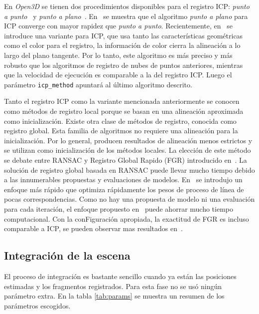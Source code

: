En \textit{Open3D} se tienen dos procedimientos disponibles para el registro ICP: \textit{punto a punto}~\cite{besl1992method}  y \textit{punto a plano}~\cite{chen1992object}. En~\cite{rusinkiewicz2001efficient} se muestra que el algoritmo \textit{punto a plano} para ICP converge con mayor rapidez que \textit{punto a punto}. Recientemente, en~\cite{park2017colored} se introduce una variante para ICP, que usa tanto las características geométricas como el color para el registro, la información de color cierra la alineación a lo largo del plano tangente. Por lo tanto, este algoritmo es más preciso y más robusto que los algoritmos de registro de nubes de puntos anteriores, mientras que la velocidad de ejecución es comparable a la del registro ICP. Luego el parámetro \verb|icp_method| apuntará al último algoritmo descrito.

Tanto el registro ICP como la variante mencionada anteriormente se conocen como métodos de registro local porque se basan en una alineación aproximada como inicialización. Existe otra clase de métodos de registro, conocida como registro global. Esta familia de algoritmos no requiere una alineación para la inicialización. Por lo general, producen resultados de alineación menos estrictos y se utilizan como inicialización de los métodos locales. La elección de este método se debate entre RANSAC y Registro Global Rapido (FGR) introducido en~\cite{zhou2016fast}. La solución de registro global basada en RANSAC puede llevar mucho tiempo debido a las innumerables propuestas y evaluaciones de modelos. En~\cite{zhou2016fast} se introdujo un enfoque más rápido que optimiza rápidamente los pesos de proceso de línea de pocas correspondencias. Como no hay una propuesta de modelo ni una evaluación para cada iteración, el enfoque propuesto en~\cite{zhou2016fast} puede ahorrar mucho tiempo computacional. Con la conFiguración apropiada, la exactitud de FGR es incluso comparable a ICP, se pueden observar mas resultados en~\cite{zhou2016fast}.

\subsection{Integración de la escena}

El proceso de integración es bastante sencillo cuando ya están las posiciones estimadas y los fragmentos registrados. Para esta fase no se usó ningún parámetro extra. En la tabla \ref{tab:params} se muestra un resumen de los parámetros escogidos.

